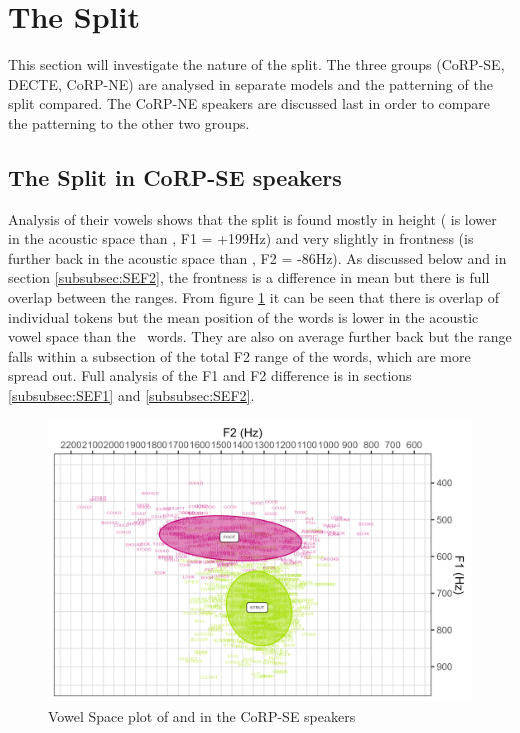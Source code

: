 \documentclass[../../../00.FullDoc/tex/APRReport-year4]{subfiles}
\begin{document}
\section{The  Split}	 \label{sec:FSSplit}
This section will investigate the nature of the \FS split. The three groups (CoRP-SE, DECTE, CoRP-NE) are analysed in separate models and the patterning of the \FS split compared. The CoRP-NE speakers are discussed last in order to compare the patterning to the other two groups.

\subsection{The  Split in CoRP-SE speakers}
Analysis of their vowels shows that the split is found mostly in height (\strutt{} is lower in the acoustic space than \foot{}, F1 = +199Hz) and very slightly in frontness (\strutt is further back in the acoustic space than \foot{}, F2 = -86Hz). As discussed below and in section \ref{subsubsec:SEF2}, the frontness is a difference in mean but there is full overlap between the ranges.
From figure \ref{fig:FSvplotSE} it can be seen that there is overlap of individual tokens but the mean position of the \strutt{} words is lower in the acoustic vowel space than the \foot\ words. They are also on average further back but the range falls within a subsection of the total F2 range of the  \foot{} words, which are more spread out.
Full analysis of the F1 and F2 difference is in sections \ref{subsubsec:SEF1} and \ref{subsubsec:SEF2}.


\begin{figure}[h]
	\centering
	\includegraphics[width=\textwidth]{../figures/FS-SE-vplot.png}
	\caption{Vowel Space plot of \foot{} and \strutt{} in the CoRP-SE speakers} \label{fig:FSvplotSE}
\end{figure}
\end{document}

